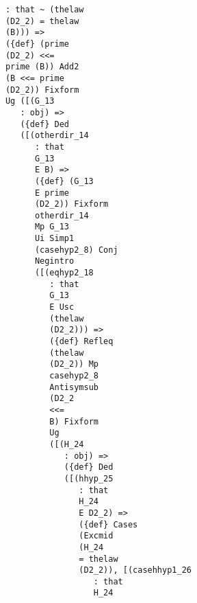 \documentclass[12pt]{article}
\begin{document}
\begin{verbatim}
                               : that ~ (thelaw 
                               (D2_2) = thelaw 
                               (B))) => 
                               ({def} (prime 
                               (D2_2) <<= 
                               prime (B)) Add2 
                               (B <<= prime 
                               (D2_2)) Fixform 
                               Ug ([(G_13 
                                  : obj) => 
                                  ({def} Ded 
                                  ([(otherdir_14 
                                     : that 
                                     G_13 
                                     E B) => 
                                     ({def} (G_13 
                                     E prime 
                                     (D2_2)) Fixform 
                                     otherdir_14 
                                     Mp G_13 
                                     Ui Simp1 
                                     (casehyp2_8) Conj 
                                     Negintro 
                                     ([(eqhyp2_18 
                                        : that 
                                        G_13 
                                        E Usc 
                                        (thelaw 
                                        (D2_2))) => 
                                        ({def} Refleq 
                                        (thelaw 
                                        (D2_2)) Mp 
                                        casehyp2_8 
                                        Antisymsub 
                                        (D2_2 
                                        <<= 
                                        B) Fixform 
                                        Ug 
                                        ([(H_24 
                                           : obj) => 
                                           ({def} Ded 
                                           ([(hhyp_25 
                                              : that 
                                              H_24 
                                              E D2_2) => 
                                              ({def} Cases 
                                              (Excmid 
                                              (H_24 
                                              = thelaw 
                                              (D2_2)), [(casehhyp1_26 
                                                 : that 
                                                 H_24 

\end{verbatim}
\end{document}
